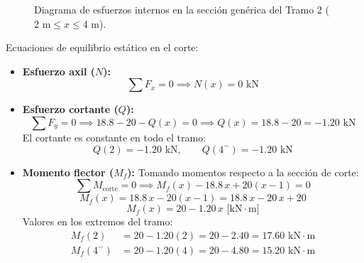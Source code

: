 \begin{figure}[H]
{%
    }
    \caption{Diagrama de esfuerzos internos en la sección genérica del Tramo 2 ($2\text{ m} \le x \le 4\text{ m}$).}
    \label{fig:ejemplo7_corte2}
\end{figure}

Ecuaciones de equilibrio estático en el corte:
\begin{itemize}
    \item \textbf{Esfuerzo axil ($N$):}
          \begin{equation}
              \sum F_x = 0 \implies \boxed{N(x) = 0\text{ kN}}
          \end{equation}

    \item \textbf{Esfuerzo cortante ($Q$):}
          \begin{equation}
              \sum F_y = 0 \implies 18.8 - 20 - Q(x) = 0 \implies \boxed{Q(x) = 18.8 - 20 = -1.20\text{ kN}}
          \end{equation}
          El cortante es constante en todo el tramo:
          \begin{equation*}
              Q(2) = -1.20\text{ kN}, \qquad Q(4^-) = -1.20\text{ kN}
          \end{equation*}

    \item \textbf{Momento flector ($M_f$):}
          Tomando momentos respecto a la sección de corte:
          \begin{equation}
              \sum M_{\text{corte}} = 0 \implies M_f(x) - 18.8\,x + 20(x - 1) = 0
          \end{equation}
          \begin{equation}
              M_f(x) = 18.8\,x - 20(x - 1) = 18.8\,x - 20\,x + 20
          \end{equation}
          \begin{equation}
              \boxed{M_f(x) = 20 - 1.20\,x\text{ [kN}\cdot\text{m]}}
          \end{equation}
          Valores en los extremos del tramo:
          \begin{align*}
              M_f(2)   & = 20 - 1.20(2) = 20 - 2.40 = 17.60\text{ kN}\cdot\text{m} \\
              M_f(4^-) & = 20 - 1.20(4) = 20 - 4.80 = 15.20\text{ kN}\cdot\text{m}
          \end{align*}
\end{itemize}

